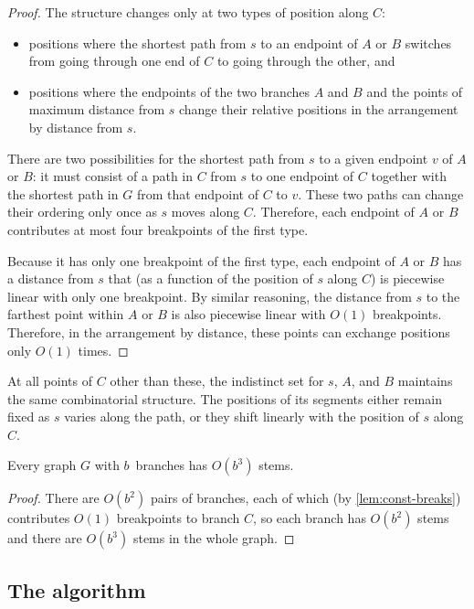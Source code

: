 \documentclass{jgaa-art}
\begin{document}
\begin{proof}
The structure changes only at two types of position along $C$:
\begin{itemize}
\item positions where the shortest path from $s$ to an endpoint of $A$ or $B$ switches from going through one end of $C$ to going through the other, and
\item positions where the endpoints of the two branches $A$ and $B$ and the points of maximum distance from $s$ change their relative positions in the arrangement by distance from $s$.
\end{itemize}
There are two possibilities for the shortest path from $s$ to a given endpoint $v$ of $A$ or $B$: it must consist of a path in $C$ from $s$ to one endpoint of $C$ together with the shortest path in $G$ from that endpoint of $C$ to $v$. These two paths can change their ordering only once as $s$ moves along $C$. Therefore, each endpoint of $A$ or $B$ contributes at most four breakpoints of the first type.

Because it has only one breakpoint of the first type, each endpoint of $A$ or $B$ has a distance from $s$ that (as a function of the position of $s$ along $C$) is piecewise linear with only one breakpoint. By similar reasoning, the distance from $s$ to the farthest point within $A$ or $B$ is also piecewise linear with $O(1)$ breakpoints. Therefore, in the arrangement by distance, these points can exchange positions only $O(1)$ times.
\end{proof}

At all points of $C$ other than these, the indistinct set for $s$, $A$, and $B$ maintains the same combinatorial structure.  The positions of its segments either remain fixed as $s$ varies along the path, or they shift linearly with the position of $s$ along $C$.

\begin{lemma}
Every graph $G$ with $b$~branches has $O(b^3)$ stems.
\end{lemma}

\begin{proof}
There are $O(b^2)$ pairs of branches, each of which (by \autoref{lem:const-breaks}) contributes $O(1)$ breakpoints to branch $C$, so each branch has $O(b^2)$ stems and there are $O(b^3)$ stems in the whole graph.
\end{proof}

\subsection{The algorithm}
\end{document}
